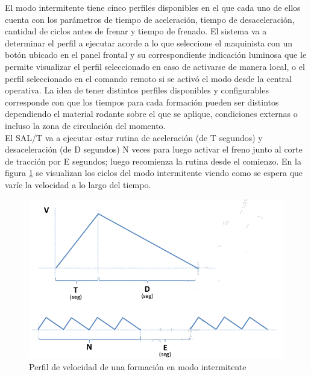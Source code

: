 El modo intermitente tiene cinco perfiles disponibles en el que cada uno de ellos cuenta con los parámetros de tiempo de aceleración, tiempo de desaceleración, cantidad de ciclos antes de frenar y tiempo de frenado. El sistema va a determinar el perfil a ejecutar acorde a lo que seleccione el maquinista con un botón ubicado en el panel frontal y su correspondiente indicación luminosa que le permite visualizar el perfil seleccionado en caso de activarse de manera local, o el perfil seleccionado en el comando remoto si se activó el modo desde la central operativa. La idea de tener distintos perfiles disponibles y configurables corresponde con que los tiempos para cada formación pueden ser distintos dependiendo el material rodante sobre el que se aplique, condiciones externas o incluso la zona de circulación del momento.\\

El SAL/T va a ejecutar estar rutina de aceleración (de T segundos) y desaceleración (de D segundos) N veces para luego activar el freno junto al corte de tracción por E segundos; luego recomienza la rutina desde el comienzo. En la figura \ref{fig:intermitente} se visualizan los ciclos del modo intermitente viendo como se espera que varíe la velocidad a lo largo del tiempo. 

\begin{figure}[H]
    \centering
    \includegraphics[width = \linewidth]{img/intermitente.png}    
    \caption{Perfil de velocidad de una formación en modo intermitente}
    \label{fig:intermitente}
\end{figure}    
